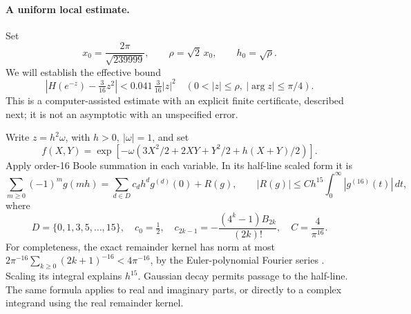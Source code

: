 \documentclass[11pt]{article}
\begin{document}
\paragraph{A uniform local estimate.}
Set
\[
 x_0=\frac{2\pi}{\sqrt{239999}},\qquad
 \rho=\sqrt2\,x_0,\qquad h_0=\sqrt\rho .
\]
We will establish the effective bound
\begin{equation}\label{local}
 \left|H(e^{-z})-\tfrac3{16}z^2\right|
 <0.041\,\tfrac3{16}|z|^2
 \quad(0<|z|\leq\rho,\ |\arg z|\leq\pi/4).
\end{equation}
This is a computer-assisted estimate with an explicit finite certificate,
described next; it is not an asymptotic with an unspecified error.

Write \(z=h^2\omega\), with \(h>0,\ |\omega|=1\), and set
\[
 f(X,Y)=\exp[-\omega(3X^2/2+2XY+Y^2/2+h(X+Y)/2)].
\]
Apply order-16 Boole summation \cite[24.17.1--2]{DLMF} in each variable.
In its half-line scaled form it is
\begin{equation}\label{boole}
 \sum_{m\geq0}(-1)^m g(mh)
 =\sum_{d\in D}c_dh^dg^{(d)}(0)+R(g),\qquad
 |R(g)|\leq C h^{15}\int_0^\infty|g^{(16)}(t)|\,dt,
\end{equation}
where
\[
 D=\{0,1,3,5,\ldots,15\},\quad c_0=\tfrac12,\quad
 c_{2k-1}=-\frac{(4^k-1)B_{2k}}{(2k)!},\quad C=\frac4{\pi^{16}}.
\]
For completeness, the exact remainder kernel has norm at most
\(2\pi^{-16}\sum_{k\geq0}(2k+1)^{-16}<4\pi^{-16}\), by the
Euler-polynomial Fourier series \cite[24.8.5]{DLMF}. Scaling its integral
explains \(h^{15}\). Gaussian decay permits passage to the half-line.
The same formula applies to real and imaginary parts, or directly to a
complex integrand using the real remainder kernel.
\end{document}
